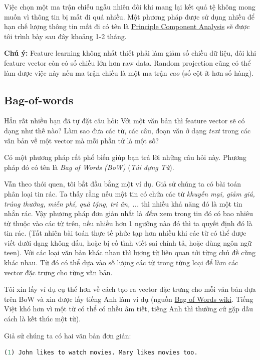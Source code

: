 Việc chọn một ma trận chiếu ngẫu nhiên đôi khi mang lại kết quả tệ không mong muốn vì thông tin bị mất đi quá nhiều. Một phương pháp được sử dụng nhiều để hạn chế lượng thông tin mất đi có tên là \href{https://en.wikipedia.org/wiki/Principal_component_analysis}{Principle Component Analysis} sẽ được tôi trình bày sau đây khoảng 1-2 tháng.  
 
\textbf{Chú ý:} Feature learning không nhất thiết phải làm giảm số chiều dữ liệu, đôi khi feature vector còn có số chiều lớn hơn raw data. Random projection cũng có thể làm được việc này nếu ma trận chiếu là một ma trận \textit{cao} (số cột ít hơn số hàng). 
 
 
\subsection{Bag-of-words }
Hẳn rất nhiều bạn đã tự đặt câu hỏi: Với một văn bản thì feature vector sẽ có dạng như thế nào? Làm sao đưa các từ, các câu, đoạn văn ở dạng \textit{text} trong các văn bản về một vector mà mỗi phần tử là một số?  
 
Có một phương pháp rất phổ biến giúp bạn trả lời những câu hỏi này. Phương pháp đó có tên là \textit{Bag of Words (BoW)} (\textit{Túi đựng Từ}). 
 
Vẫn theo thói quen, tôi bắt đầu bằng một ví dụ. Giả sử chúng ta có bài toán phân loại tin rác. Ta thấy rằng nếu một tin có chứa các từ \textit{khuyến mại, giảm giá, trúng thưởng, miễn phí, quà tặng, tri ân, ...} thì nhiều khả năng đó là một tin nhắn rác. Vậy phương pháp đơn giản nhất là \textit{đếm} xem trong tin đó có bao nhiêu từ thuộc vào các từ trên, nếu nhiều hơn 1 ngưỡng nào đó thì ta quyết định đó là tin rác. (Tất nhiên bài toán thực tế phức tạp hơn nhiều khi các từ có thể được viết dưới dạng không dấu, hoặc bị cố tình viết sai chính tả, hoặc dùng ngôn ngữ teen). Với các loại văn bản khác nhau thì lượng từ liên quan tới từng chủ đề cũng khác nhau. Từ đó có thể dựa vào số lượng các từ trong từng loại để làm các vector đặc trưng cho từng văn bản.  
 
Tôi xin lấy ví dụ cụ thể hơn về cách tạo ra vector đặc trưng cho mỗi văn bản dựa trên BoW và xin được lấy tiếng Anh làm ví dụ (nguồn \href{https://en.wikipedia.org/wiki/Bag-of-words_model}{Bag of Words wiki}. Tiếng Việt khó hơn vì một từ có thể có nhều âm tiết, tiếng Anh thì thường cứ gặp dấu cách là kết thúc một từ).  
 
Giả sử chúng ta có hai văn bản đơn giản: 
 
\begin{lstlisting}[language=Python]
(1) John likes to watch movies. Mary likes movies too. 
\end{lstlisting}
 
